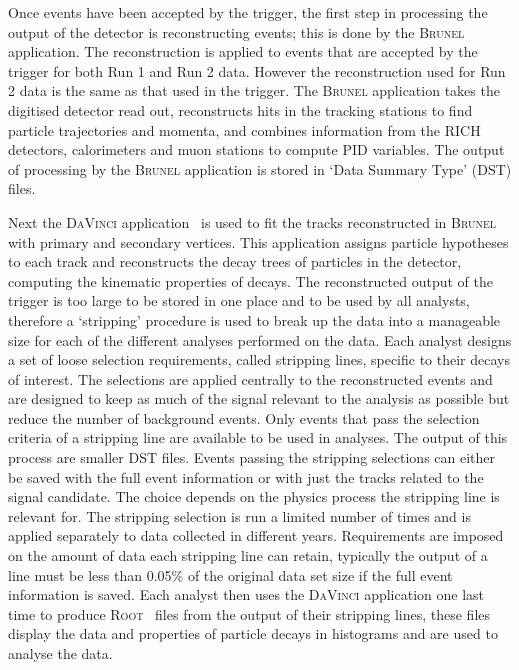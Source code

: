 Once events have been accepted by the trigger, the first step in processing the output of the detector is reconstructing events; this is done by the \textsc{Brunel}~\cite{Brunel} application. The reconstruction is applied to events that are accepted by the trigger for both Run 1 and Run 2 data. However the reconstruction used for Run 2 data is the same as that used in the trigger. The \textsc{Brunel} application takes the digitised detector read out, reconstructs hits in the tracking stations to find particle trajectories and momenta, and combines information from the RICH detectors, calorimeters and muon stations to compute PID variables. The output of processing by the \textsc{Brunel} application is stored in `Data Summary Type' (DST) files. 

Next the \textsc{DaVinci} application~\cite{DV} is used to fit the tracks reconstructed in \textsc{Brunel} with primary and secondary vertices. This application assigns particle hypotheses to each track and reconstructs the decay trees of particles in the detector, computing the kinematic properties of decays. The reconstructed output of the trigger is too large to be stored in one place and to be used by all analysts, therefore a `stripping' procedure is used to break up the data into a manageable size for each of the different analyses performed on the data. Each analyst designs a set of loose selection requirements, called stripping lines, specific to their decays of interest. The selections are applied centrally to the reconstructed events and are designed to keep as much of the signal relevant to the analysis as possible but reduce the number of background events. Only events that pass the selection criteria of a stripping line are available to be used in analyses. The output of this process are smaller DST files. Events passing the stripping selections can either be saved with the full event information or with just the tracks related to the signal candidate. The choice depends on the physics process the stripping line is relevant for. The stripping selection is run a limited number of times and is applied separately to data collected in different years. Requirements are imposed on the amount of data each stripping line can retain, typically the output of a line must be less than 0.05$\%$ of the original data set size if the full event information is saved. Each analyst then uses the \textsc{DaVinci} application one last time to produce \textsc{Root}~\cite{Brun:1997pa} files from the output of their stripping lines, these files display the data and properties of particle decays in histograms and are used to analyse the data. %


